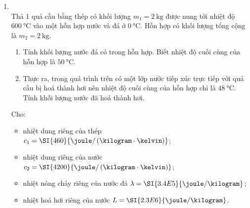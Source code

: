 \begin{enumerate}[label=\bfseries Câu \arabic*:, leftmargin=1.7cm]
\item {}\\
Thả 1 quả cầu bằng thép có khối lượng $m_1=\SI{2}{\kilogram}$ được nung tới nhiệt độ $\SI{600}{\celsius}$ vào một hỗn hợp nước và đá ở $\SI{0}{\celsius}$. Hỗn hợp có khối lượng tổng cộng là $m_2=\SI{2}{\kilogram}$.
\begin{enumerate}[label=\alph*)]
	\item Tính khối lượng nước đá có trong hỗn hợp. Biết nhiệt độ cuối cùng của hỗn hợp là $\SI{50}{\celsius}$.
	\item Thực ra, trong quá trình trên có một lớp nước tiếp xúc trực tiếp với quả cầu bị hoá thành hơi nên nhiệt độ cuối cùng của hỗn hợp chỉ là $\SI{48}{\celsius}$. Tính khối lượng nước đã hoá thành hơi.
\end{enumerate}
Cho:
\begin{itemize}
	\item nhiệt dung riêng của thép $c_1=\SI{460}{\joule/\left(\kilogram\cdot\kelvin\right)}$;
	\item nhiệt dung riêng của nước $c_2=\SI{4200}{\joule/\left(\kilogram\cdot\kelvin\right)}$;
	\item nhiệt nóng chảy riêng của nước đá $\lambda=\SI{3.4E5}{\joule/\kilogram}$;
	\item nhiệt hoá hơi riêng của nước $L=\SI{2.3E6}{\joule/\kilogram}$.
\end{itemize}

\end{enumerate}
